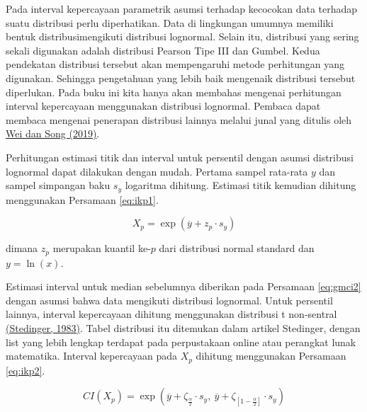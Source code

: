 \documentclass[]{book}
\begin{document}
Pada interval kepercayaan parametrik asumsi terhadap kecocokan data
terhadap suatu distribusi perlu diperhatikan. Data di lingkungan umumnya
memiliki bentuk distribusimengikuti distribusi lognormal. Selain itu,
distribusi yang sering sekali digunakan adalah distribusi Pearson Tipe
III dan Gumbel. Kedua pendekatan distribusi tersebut akan mempengaruhi
metode perhitungan yang digunakan. Sehingga pengetahuan yang lebih baik
mengenaik distribusi tersebut diperlukan. Pada buku ini kita hanya akan
membahas mengenai perhitungan interval kepercayaan menggunakan
distribusi lognormal. Pembaca dapat membaca mengenai penerapan
distribusi lainnya melalui junal yang ditulis oleh
\href{https://www.google.com/url?sa=t\&rct=j\&q=\&esrc=s\&source=web\&cd=28\&ved=2ahUKEwjnkojIgNnhAhXBh3AKHSJOBLM4ChAWMBF6BAgHEAI\&url=https\%3A\%2F\%2Fwww.preprints.org\%2Fmanuscript\%2F201901.0164\%2Fv1\%2Fdownload\&usg=AOvVaw0evYfNso3_IwVWnmJMKsSp}{Wei
dan Song (2019)}.

Perhitungan estimasi titik dan interval untuk persentil dengan asumsi
distribusi lognormal dapat dilakukan dengan mudah. Pertama sampel
rata-rata \(y\) dan sampel simpangan baku \(s_y\) logaritma dihitung.
Estimasi titik kemudian dihitung menggunakan Persamaan \eqref{eq:ikp1}.

\begin{equation}
  X_p=\exp\left(\overline{y}+z_p\cdot s_y\right)
  \label{eq:ikp1}
\end{equation}

dimana \(z_p\) merupakan kuantil ke-\(p\) dari distribusi normal
standard dan \(y=\ln{(x)}\).

Estimasi interval untuk median sebelumnya diberikan pada Persamaan
\eqref{eq:gmci2} dengan asumsi bahwa data mengikuti distribusi lognormal.
Untuk persentil lainnya, interval kepercayaan dihitung menggunakan
distribusi t non-sentral
\href{https://www.researchgate.net/publication/277664323_Confidence_Intervals_for_Design_Events}{(Stedinger,
1983)}. Tabel distribusi itu ditemukan dalam artikel Stedinger, dengan
list yang lebih lengkap terdapat pada perpustakaan online atau perangkat
lunak matematika. Interval kepercayaan pada \(X_p\) dihitung menggunakan
Persamaan \eqref{eq:ikp2}.

\begin{equation}
  CI\left(X_p\right)=\exp\left(\overline{y}+\zeta_{\frac{\alpha}{2}}\cdot s_y,\ \overline{y}+\zeta_{\left[1-\frac{\alpha}{2}\right]}\cdot s_y\right)
  \label{eq:ikp2}
\end{equation}
\end{document}
